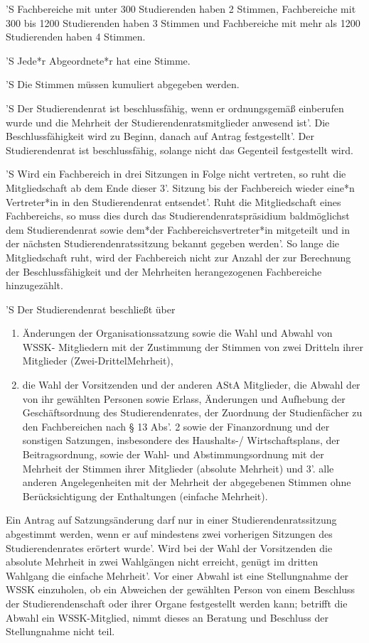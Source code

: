 \documentclass[fontsize=12pt,parskip=half]{scrartcl}
\begin{document}
\begin{contract}
  'S Fachbereiche mit unter 300 Studierenden haben 2 Stimmen, Fachbereiche mit 300
  bis 1200 Studierenden haben 3 Stimmen und Fachbereiche mit mehr als 1200
  Studierenden haben 4 Stimmen.

  'S Jede*r Abgeordnete*r hat eine Stimme.

  'S Die Stimmen müssen kumuliert abgegeben werden.



  'S Der Studierendenrat ist beschlussfähig, wenn er ordnungsgemäß einberufen wurde
  und die Mehrheit der Studierendenratsmitglieder anwesend ist'. Die
  Beschlussfähigkeit wird zu Beginn, danach auf Antrag festgestellt'. Der
  Studierendenrat ist beschlussfähig, solange nicht das Gegenteil festgestellt
  wird.

  'S Wird ein Fachbereich in drei Sitzungen in Folge nicht vertreten, so ruht die
  Mitgliedschaft ab dem Ende dieser 3'. Sitzung bis der Fachbereich wieder eine*n
  Vertreter*in in den Studierendenrat entsendet'. Ruht die Mitgliedschaft eines
  Fachbereichs, so muss dies durch das Studierendenratspräsidium baldmöglichst
  dem Studierendenrat sowie dem*der Fachbereichsvertreter*in mitgeteilt und in
  der nächsten Studierendenratssitzung bekannt gegeben werden'. So lange die
  Mitgliedschaft ruht, wird der Fachbereich nicht zur Anzahl der zur Berechnung
  der Beschlussfähigkeit und der Mehrheiten herangezogenen Fachbereiche
  hinzugezählt.

  'S Der Studierendenrat beschließt über
  \begin{enumerate}[\qquad 1.]
    \item Änderungen der Organisationssatzung sowie die Wahl und Abwahl von
      WSSK- Mitgliedern mit der Zustimmung der Stimmen von zwei Dritteln ihrer
      Mitglieder (Zwei-DrittelMehrheit),
    \item die Wahl der Vorsitzenden und der anderen AStA Mitglieder, die Abwahl
      der von ihr gewählten Personen sowie Erlass, Änderungen und Aufhebung der
      Geschäftsordnung des Studierendenrates, der Zuordnung der Studienfächer zu
      den Fachbereichen nach § 13 Abs'. 2 sowie der Finanzordnung und der
      sonstigen Satzungen, insbesondere des Haushalts-/ Wirtschaftsplans, der
      Beitragsordnung, sowie der Wahl- und Abstimmungsordnung mit der Mehrheit
      der Stimmen ihrer Mitglieder (absolute Mehrheit) und 3'. alle anderen
      Angelegenheiten mit der Mehrheit der abgegebenen Stimmen ohne
      Berücksichtigung der Enthaltungen (einfache Mehrheit).
  \end{enumerate}
  Ein Antrag auf Satzungsänderung darf nur in einer Studierendenratssitzung
  abgestimmt werden, wenn er auf mindestens zwei vorherigen Sitzungen des
  Studierendenrates erörtert wurde'. Wird bei der Wahl der Vorsitzenden die
  absolute Mehrheit in zwei Wahlgängen nicht erreicht, genügt im dritten
  Wahlgang die einfache Mehrheit'. Vor einer Abwahl ist eine Stellungnahme der
  WSSK einzuholen, ob ein Abweichen der gewählten Person von einem Beschluss der
  Studierendenschaft oder ihrer Organe festgestellt werden kann; betrifft die
  Abwahl ein WSSK-Mitglied, nimmt dieses an Beratung und Beschluss der
  Stellungnahme nicht teil.


\end{contract}
\end{document}
